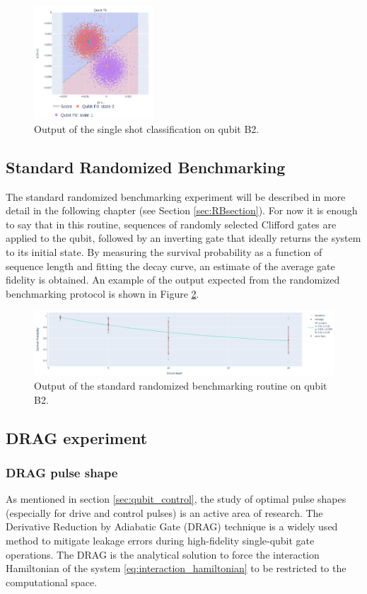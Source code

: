 \begin{figure}[h!]
    \centering
    \includegraphics[width=0.4\textwidth]{figures/png/classification.png}
    \caption{Output of the single shot classification on qubit B2.}
    \label{fig:classification}
\end{figure}


\subsection{Standard Randomized Benchmarking}
The standard randomized benchmarking experiment will be described in more detail in the following chapter (see Section \ref{sec:RBsection}).
For now it is enough to say that in this routine, sequences of randomly selected Clifford gates are applied to the qubit, followed by an inverting gate that ideally returns the system to its initial state. 
By measuring the survival probability as a function of sequence length and fitting the decay curve, an estimate of the average gate fidelity is obtained.
An example of the output expected from the randomized benchmarking protocol is shown in Figure \ref{fig:rb}.

\begin{figure}[h!]
    \centering
    \includegraphics[width=\textwidth]{figures/png/rb.png}
    \caption{Output of the standard randomized benchmarking routine on qubit B2.}
    \label{fig:rb}
\end{figure}


\subsection{DRAG experiment}\label{sec:DRAG}
\subsubsection{DRAG pulse shape}
As mentioned in section \ref{sec:qubit_control}, the study of optimal pulse shapes (especially for drive and control pulses) is an active area of research. 
The Derivative Reduction by Adiabatic Gate (DRAG) technique \cite{Motzoi_2009}\cite{Gambetta_2011} is a widely used method to mitigate leakage errors during high-fidelity single-qubit gate operations.
The DRAG is the analytical solution to force the interaction Hamiltonian of the system \ref{eq:interaction_hamiltonian} to be restricted to the computational space.


